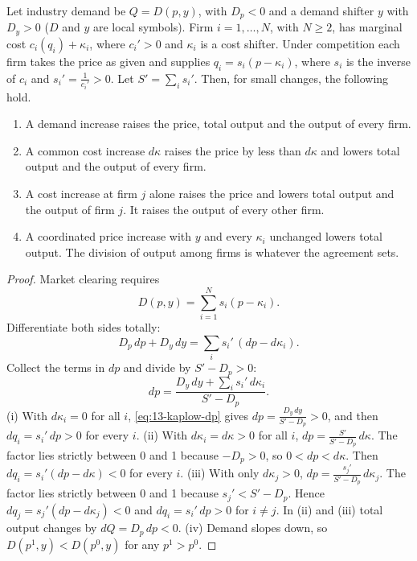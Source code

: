 \begin{proposition}\label{prop:13-kaplow-signs}
Let industry demand be $Q = D(p, y)$, with $D_p < 0$ and a demand shifter $y$ with $D_y > 0$ ($D$ and $y$ are
local symbols). Firm $i = 1, \dots, N$, with $N \geq 2$, has marginal cost $c_i(q_i) + \kappa_i$, where $c_i' > 0$
and $\kappa_i$ is a cost shifter. Under competition each firm takes the price as given and supplies
$q_i = s_i(p - \kappa_i)$, where $s_i$ is the inverse of $c_i$ and $s_i' = \frac{1}{c_i'} > 0$. Let
$S' = \sum_i s_i'$. Then, for small changes, the following hold.
\begin{enumerate}[label=(\roman*)]
\item A demand increase raises the price, total output and the output of every firm.
\item A common cost increase $d\kappa$ raises the price by less than $d\kappa$ and lowers total output and the
output of every firm.
\item A cost increase at firm $j$ alone raises the price and lowers total output and the output of firm $j$. It
raises the output of every other firm.
\item A coordinated price increase with $y$ and every $\kappa_i$ unchanged lowers total output. The division of
output among firms is whatever the agreement sets.
\end{enumerate}
\end{proposition}

\begin{proof}
Market clearing requires
\begin{equation*}
  D(p, y) = \sum_{i=1}^{N} s_i(p - \kappa_i) .
\end{equation*}
Differentiate both sides totally:
\begin{equation*}
  D_p\,dp + D_y\,dy = \sum_{i} s_i'\,(dp - d\kappa_i) .
\end{equation*}
Collect the terms in $dp$ and divide by $S' - D_p > 0$:
\begin{equation}\label{eq:13-kaplow-dp}
  dp = \frac{D_y\,dy + \sum_i s_i'\,d\kappa_i}{S' - D_p} .
\end{equation}
(i) With $d\kappa_i = 0$ for all $i$, \eqref{eq:13-kaplow-dp} gives $dp = \frac{D_y\,dy}{S' - D_p} > 0$, and then
$dq_i = s_i'\,dp > 0$ for every $i$.
(ii) With $d\kappa_i = d\kappa > 0$ for all $i$, $dp = \frac{S'}{S' - D_p}\,d\kappa$. The factor lies strictly
between 0 and 1 because $-D_p > 0$, so $0 < dp < d\kappa$. Then $dq_i = s_i'(dp - d\kappa) < 0$ for every $i$.
(iii) With only $d\kappa_j > 0$, $dp = \frac{s_j'}{S' - D_p}\,d\kappa_j$. The factor lies strictly between 0 and 1
because $s_j' < S' - D_p$. Hence $dq_j = s_j'(dp - d\kappa_j) < 0$ and $dq_i = s_i'\,dp > 0$ for $i \neq j$. In
(ii) and (iii) total output changes by $dQ = D_p\,dp < 0$.
(iv) Demand slopes down, so $D(p^1, y) < D(p^0, y)$ for any $p^1 > p^0$.
\end{proof}

